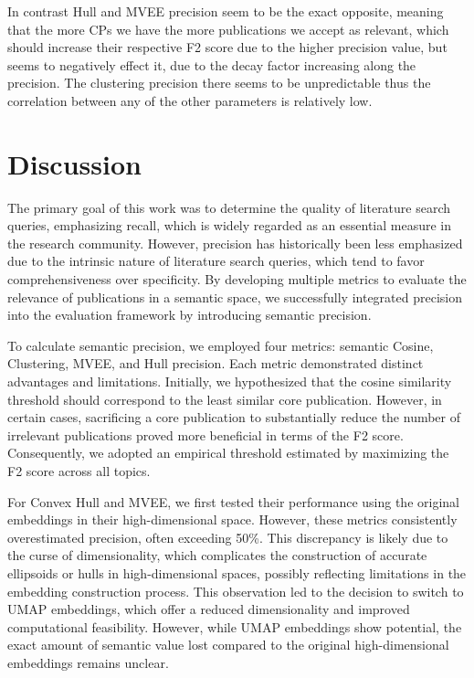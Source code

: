 In contrast Hull and MVEE precision seem to be the exact opposite, meaning that the more CPs we have the more publications we accept as relevant, which should increase their respective F2 score due to the higher precision value, but seems to negatively effect it, due to the decay factor increasing along the precision. The clustering precision there seems to be unpredictable thus the correlation between any of the other parameters is relatively low.

\section{Discussion}

The primary goal of this work was to determine the quality of literature search queries, emphasizing recall, which is widely regarded as an essential measure in the research community. However, precision has historically been less emphasized due to the intrinsic nature of literature search queries, which tend to favor comprehensiveness over specificity. By developing multiple metrics to evaluate the relevance of publications in a semantic space, we successfully integrated precision into the evaluation framework by introducing semantic precision.

To calculate semantic precision, we employed four metrics: semantic Cosine, Clustering, MVEE, and Hull precision. Each metric demonstrated distinct advantages and limitations. Initially, we hypothesized that the cosine similarity threshold should correspond to the least similar core publication. However, in certain cases, sacrificing a core publication to substantially reduce the number of irrelevant publications proved more beneficial in terms of the F2 score. Consequently, we adopted an empirical threshold estimated by maximizing the F2 score across all topics.

For Convex Hull and MVEE, we first tested their performance using the original embeddings in their high-dimensional space. However, these metrics consistently overestimated precision, often exceeding 50\%. This discrepancy is likely due to the curse of dimensionality, which complicates the construction of accurate ellipsoids or hulls in high-dimensional spaces, possibly reflecting limitations in the embedding construction process. This observation led to the decision to switch to UMAP embeddings, which offer a reduced dimensionality and improved computational feasibility. However, while UMAP embeddings show potential, the exact amount of semantic value lost compared to the original high-dimensional embeddings remains unclear.

